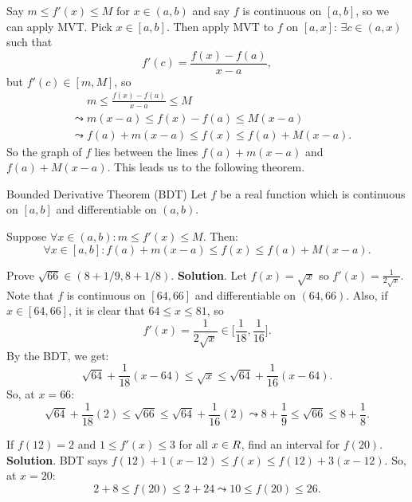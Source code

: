 Say $ m\le f'(x)\le M $ for $ x\in(a,b) $ and say $ f $ is continuous on $ [a,b] $, so we can apply MVT\@.
Pick $ x\in[a,b] $. Then apply MVT to $ f $ on $ [a,x] $: $ \exists c\in(a,x) $ such that
\[ f'(c)=\frac{f(x)-f(a)}{x-a}, \]
but $ f'(c)\in[m,M] $, so
\begin{align*}
     & \phantom{{}\leadsto{}} m\le \frac{f(x)-f(a)}{x-a}\le M \\
     & \leadsto m(x-a)\le f(x)-f(a)\le M(x-a)                 \\
     & \leadsto f(a)+m(x-a)\le f(x)\le f(a)+M(x-a).
\end{align*}
So the graph of $ f $ lies between the lines $ f(a)+m(x-a) $ and $ f(a)+M(x-a) $. This leads us to the following theorem.
\begin{Theorem}{Bounded Derivative Theorem (BDT)}{}
    Let $ f $ be a real function which is continuous on $ [a,b] $ and differentiable on $ (a,b) $.

    Suppose $ \forall x\in(a,b):m\le f'(x)\le M $. Then:
    \[ \forall x\in[a,b]:f(a)+m(x-a)\le f(x)\le f(a)+M(x-a). \]
\end{Theorem}
\begin{Example}{}{}
    Prove $ \sqrt{66}\in(8+1/9,8+1/8) $.
    \tcblower{}
    \textbf{Solution}. Let $ f(x)=\sqrt{x} $ so $ f'(x)=\frac{1}{2\sqrt{x}} $. Note that $ f $
    is continuous on $ [64,66] $ and differentiable on $ (64,66) $. Also,
    if $ x\in[64,66] $, it is clear that $ 64\le x\le 81 $, so
    \[ f'(x)=\frac{1}{2\sqrt{x}}\in\biggl[\frac{1}{18},\frac{1}{16}\biggr]. \]
    By the BDT, we get:
    \[ \sqrt{64}+\frac{1}{18}(x-64)\le \sqrt{x}\le \sqrt{64}+\frac{1}{16}(x-64). \]
    So, at $ x=66 $:
    \[ \sqrt{64}+\frac{1}{18}(2)\le \sqrt{66}\le \sqrt{64}+\frac{1}{16}(2)\leadsto 8+\frac{1}{9}\le \sqrt{66}\le 8+\frac{1}{8}. \]
\end{Example}
\begin{Example}{}{}
    If $ f(12)=2 $ and $ 1\le f'(x)\le 3 $ for all $ x\in\relax{R} $, find an interval for $ f(20) $.
    \tcblower{}
    \textbf{Solution}. BDT says $ f(12)+1(x-12)\le f(x)\le f(12)+3(x-12) $. So, at $ x=20 $:
    \[ 2+8\le f(20)\le 2+24\leadsto 10\le f(20)\le 26. \]
\end{Example}
